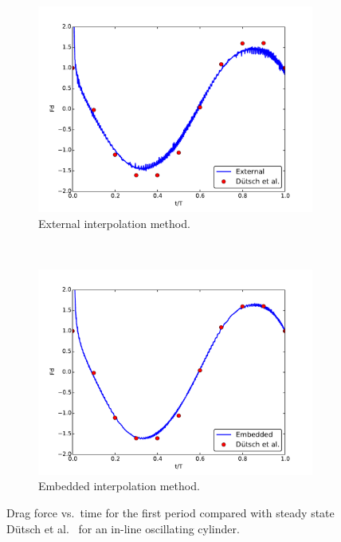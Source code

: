 \begin{figure}[!htb]
	\centering
	\par\medskip
	\begin{subfigure}{0.4\textwidth}
		\includegraphics[width=\linewidth]{staticexinit}
		\caption{External interpolation method.}
	\end{subfigure}
	~
	\begin{subfigure}{0.4\textwidth}
		\includegraphics[width=\linewidth]{staticeminit}
		\caption{Embedded interpolation method.}
	\end{subfigure}
	\caption{Drag force vs.~time for the first period compared with steady state D\"{u}tsch et al.~\cite{dutsch1998low} for an in-line oscillating cylinder.}
	\label{fig:staticInit}
\end{figure}

